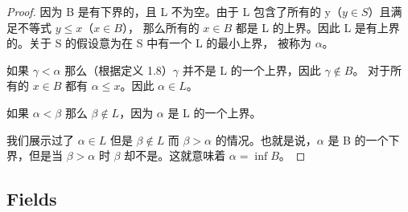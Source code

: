 \documentclass[../poma-note.tex]{subfiles}
\begin{document}
\begin{proof}
	因为 B 是有下界的，且 L 不为空。由于 L 包含了所有的 y（$y \in S$）且满足不等式 $y \leq x$（$x \in B$），
	那么所有的 $x \in B$ 都是 L 的上界。因此 L 是有上界的。关于 S 的假设意为在 S 中有一个 L 的最小上界，
	被称为 $\alpha$。

	如果 $\gamma < \alpha$ 那么（根据定义 1.8）$\gamma$ 并不是 L 的一个上界，因此 $\gamma \notin B$。
	对于所有的 $x \in B$ 都有 $\alpha \le x$。因此 $\alpha \in L$。

	如果 $\alpha < \beta$ 那么 $\beta \notin L$，因为 $\alpha$ 是 L 的一个上界。

	我们展示过了 $\alpha \in L$ 但是 $\beta \notin L$ 而 $\beta > \alpha$ 的情况。也就是说，$\alpha$
	是 B 的一个下界，但是当 $\beta > \alpha$ 时 $\beta$ 却不是。这就意味着 $\alpha = \inf B$。
\end{proof}

\subsection*{Fields}
\end{document}

